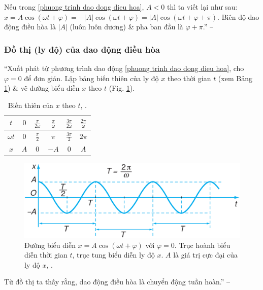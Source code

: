 \documentclass{article}
\numberwithin{equation}{section}
\begin{document}
Nếu trong \eqref{phuong trinh dao dong dieu hoa}, $A < 0$ thì ta viết lại như sau: $x = A\cos(\omega t + \varphi) = -|A|\cos(\omega t + \varphi) = |A|\cos(\omega t + \varphi + \pi)$. Biên độ dao động điều hòa là $|A|$ (luôn luôn dương) \& pha ban đầu là $\varphi + \pi$.'' -- \cite[p. 31]{SGK_Vat_Ly_12_nang_cao}

\subsubsection{Đồ thị (ly độ) của dao động điều hòa}
``Xuất phát từ phương trình dao động \eqref{phuong trinh dao dong dieu hoa}, cho $\varphi = 0$ để đơn giản. Lập bảng biến thiên của ly độ $x$ theo thời gian $t$ (xem Bảng \ref{tab:bien_thien_cua_x_theo_t}) \& vẽ đường biểu diễn $x$ theo $t$ (Fig. \ref{fig:duong_bieu_dien_dao_dong_dieu_hoa}).

\begin{table}[H]
	\centering
	\begin{tabular}{|c|c|c|c|c|c|}
		\hline
		$t$ & $0$ & $\frac{\pi}{2\omega}$ & $\frac{\pi}{\omega}$ & $\frac{3\pi}{2\omega}$ & $\frac{2\pi}{\omega}$ \\
		\hline
		$\omega t$ & $0$ & $\frac{\pi}{2}$ & $\pi$ & $\frac{3\pi}{2}$ & $2\pi$ \\
		\hline
		$x$ & $A$ & $0$ & $-A$ & $0$ & $A$ \\
		\hline
	\end{tabular}
	\caption{Biến thiên của $x$ theo $t$, \cite[Bảng 6.1, p. 31]{SGK_Vat_Ly_12_nang_cao}.}
	\label{tab:bien_thien_cua_x_theo_t}
\end{table}

\begin{figure}[H]
	\centering
	\includegraphics[scale=0.15]{duong_bieu_dien_dao_dong_dieu_hoa}
	\caption{Đường biểu diễn $x = A\cos(\omega t + \varphi)$ với $\varphi = 0$. Trục hoành biểu diễn thời gian $t$, trục tung biểu diễn ly độ $x$. $A$ là giá trị cực đại của ly độ $x$, \cite[Hình 6.4, p. 31]{SGK_Vat_Ly_12_nang_cao}.}
	\label{fig:duong_bieu_dien_dao_dong_dieu_hoa}
\end{figure}
Từ đồ thị ta thấy rằng, dao động điều hòa là chuyển động tuần hoàn.'' -- \cite[pp. 31--32]{SGK_Vat_Ly_12_nang_cao}
\end{document}
